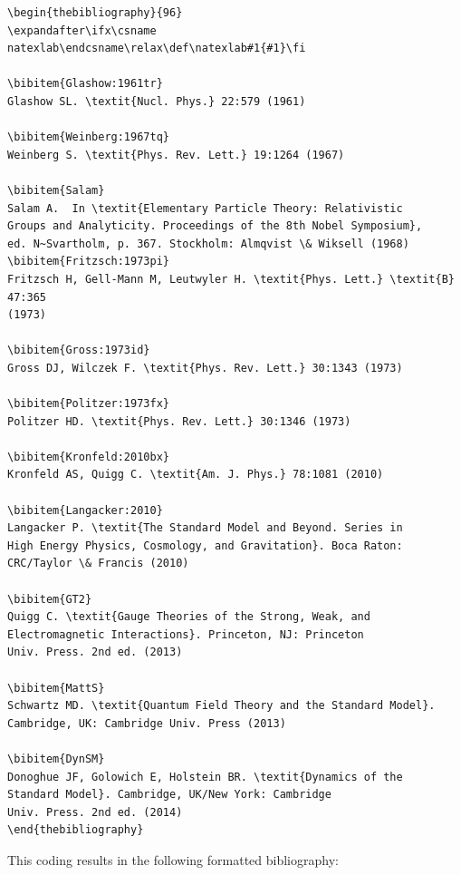 \documentclass{ar-1col}
\begin{document}
\begin{verbatim}
\begin{thebibliography}{96}
\expandafter\ifx\csname
natexlab\endcsname\relax\def\natexlab#1{#1}\fi

\bibitem{Glashow:1961tr}
Glashow SL. \textit{Nucl. Phys.} 22:579 (1961)

\bibitem{Weinberg:1967tq}
Weinberg S. \textit{Phys. Rev. Lett.} 19:1264 (1967)

\bibitem{Salam}
Salam A.  In \textit{Elementary Particle Theory: Relativistic
Groups and Analyticity. Proceedings of the 8th Nobel Symposium},
ed. N~Svartholm, p. 367. Stockholm: Almqvist \& Wiksell (1968)
\bibitem{Fritzsch:1973pi}
Fritzsch H, Gell-Mann M, Leutwyler H. \textit{Phys. Lett.} \textit{B} 47:365
(1973)

\bibitem{Gross:1973id}
Gross DJ, Wilczek F. \textit{Phys. Rev. Lett.} 30:1343 (1973)

\bibitem{Politzer:1973fx}
Politzer HD. \textit{Phys. Rev. Lett.} 30:1346 (1973)

\bibitem{Kronfeld:2010bx}
Kronfeld AS, Quigg C. \textit{Am. J. Phys.} 78:1081 (2010)

\bibitem{Langacker:2010}
Langacker P. \textit{The Standard Model and Beyond. Series in
High Energy Physics, Cosmology, and Gravitation}. Boca Raton:
CRC/Taylor \& Francis (2010)

\bibitem{GT2}
Quigg C. \textit{Gauge Theories of the Strong, Weak, and
Electromagnetic Interactions}. Princeton, NJ: Princeton
Univ. Press. 2nd ed. (2013)

\bibitem{MattS}
Schwartz MD. \textit{Quantum Field Theory and the Standard Model}.
Cambridge, UK: Cambridge Univ. Press (2013)

\bibitem{DynSM}
Donoghue JF, Golowich E, Holstein BR. \textit{Dynamics of the
Standard Model}. Cambridge, UK/New York: Cambridge
Univ. Press. 2nd ed. (2014)
\end{thebibliography}
\end{verbatim}

This coding results in the following formatted bibliography:
\end{document}
